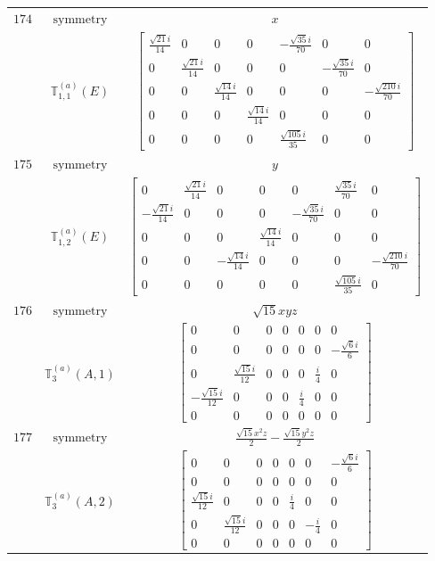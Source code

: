 \documentclass[fleqn,8pt,landscape]{jsarticle}
\begin{document}
\begin{longtable}{ccc}
$ 174 $ & $ \text{symmetry} $ & $ x $ \\
$  $ & $ \mathbb{T}_{1,1}^{(a)}(E) $ & $ \begin{bmatrix} \frac{\sqrt{21} i}{14} & 0 & 0 & 0 & - \frac{\sqrt{35} i}{70} & 0 & 0 \\ 0 & \frac{\sqrt{21} i}{14} & 0 & 0 & 0 & - \frac{\sqrt{35} i}{70} & 0 \\ 0 & 0 & \frac{\sqrt{14} i}{14} & 0 & 0 & 0 & - \frac{\sqrt{210} i}{70} \\ 0 & 0 & 0 & \frac{\sqrt{14} i}{14} & 0 & 0 & 0 \\ 0 & 0 & 0 & 0 & \frac{\sqrt{105} i}{35} & 0 & 0 \end{bmatrix} $ \\ \hline
$ 175 $ & $ \text{symmetry} $ & $ y $ \\
$  $ & $ \mathbb{T}_{1,2}^{(a)}(E) $ & $ \begin{bmatrix} 0 & \frac{\sqrt{21} i}{14} & 0 & 0 & 0 & \frac{\sqrt{35} i}{70} & 0 \\ - \frac{\sqrt{21} i}{14} & 0 & 0 & 0 & - \frac{\sqrt{35} i}{70} & 0 & 0 \\ 0 & 0 & 0 & \frac{\sqrt{14} i}{14} & 0 & 0 & 0 \\ 0 & 0 & - \frac{\sqrt{14} i}{14} & 0 & 0 & 0 & - \frac{\sqrt{210} i}{70} \\ 0 & 0 & 0 & 0 & 0 & \frac{\sqrt{105} i}{35} & 0 \end{bmatrix} $ \\ \hline
$ 176 $ & $ \text{symmetry} $ & $ \sqrt{15} x y z $ \\
$  $ & $ \mathbb{T}_{3}^{(a)}(A,1) $ & $ \begin{bmatrix} 0 & 0 & 0 & 0 & 0 & 0 & 0 \\ 0 & 0 & 0 & 0 & 0 & 0 & - \frac{\sqrt{6} i}{6} \\ 0 & \frac{\sqrt{15} i}{12} & 0 & 0 & 0 & \frac{i}{4} & 0 \\ - \frac{\sqrt{15} i}{12} & 0 & 0 & 0 & \frac{i}{4} & 0 & 0 \\ 0 & 0 & 0 & 0 & 0 & 0 & 0 \end{bmatrix} $ \\ \hline
$ 177 $ & $ \text{symmetry} $ & $ \frac{\sqrt{15} x^{2} z}{2} - \frac{\sqrt{15} y^{2} z}{2} $ \\
$  $ & $ \mathbb{T}_{3}^{(a)}(A,2) $ & $ \begin{bmatrix} 0 & 0 & 0 & 0 & 0 & 0 & - \frac{\sqrt{6} i}{6} \\ 0 & 0 & 0 & 0 & 0 & 0 & 0 \\ \frac{\sqrt{15} i}{12} & 0 & 0 & 0 & \frac{i}{4} & 0 & 0 \\ 0 & \frac{\sqrt{15} i}{12} & 0 & 0 & 0 & - \frac{i}{4} & 0 \\ 0 & 0 & 0 & 0 & 0 & 0 & 0 \end{bmatrix} $ \\ \hline

\end{longtable}
\end{document}
